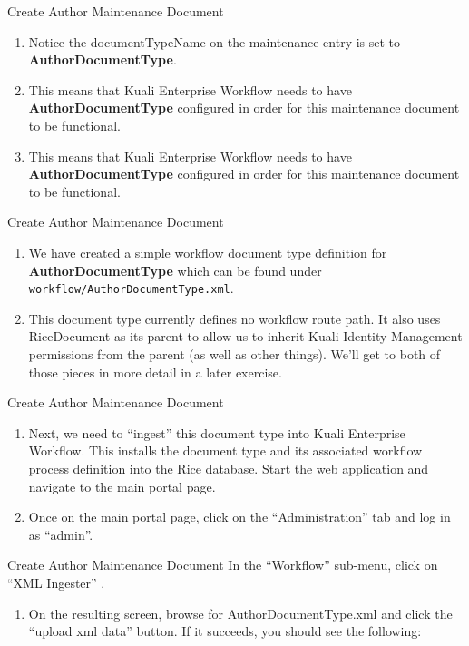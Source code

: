 \documentclass[xcolor=dvipsnames,14pt,professionalfonts]{beamer}
\begin{document}
\begin{frame}{Create Author Maintenance Document}
  \begin{enumerate}
  \item Notice the documentTypeName on the maintenance entry is set to \textbf{AuthorDocumentType}.
  \item This means that Kuali Enterprise Workflow needs to have \textbf{AuthorDocumentType} configured in order for this maintenance document to be functional.
  \item This means that Kuali Enterprise Workflow needs to have \textbf{AuthorDocumentType} configured in order for this maintenance document to be functional.
  \end{enumerate}
\end{frame}

\begin{frame}{Create Author Maintenance Document}
  \begin{enumerate}
  \item We have created a simple workflow document type definition for \textbf{AuthorDocumentType} which can be found under \texttt{workflow/AuthorDocumentType.xml}.
  \item This document type currently defines no workflow route path.
    It also uses RiceDocument as its parent to allow us to inherit
    Kuali Identity Management permissions from the parent (as well as
    other things).  We’ll get to both of those pieces in more detail in a later exercise.
  \end{enumerate}
\end{frame}

\begin{frame}{Create Author Maintenance Document}
  \begin{enumerate}
  \item Next, we need to “ingest” this document type into Kuali Enterprise Workflow.  This installs the document type and its associated workflow process definition into the Rice database.  Start the web application and navigate to the main portal page.
  \item Once on the main portal page, click on the “Administration”
    tab and log in as “admin”.
  \end{enumerate}
\end{frame}

\begin{frame}{Create Author Maintenance Document}
  In the “Workflow” sub-menu, click on “XML Ingester” .
  \begin{enumerate}
  \item On the resulting screen, browse for AuthorDocumentType.xml and click the “upload xml data” button.  If it succeeds, you should see the following:
  \end{enumerate}
\end{frame}
\end{document}
